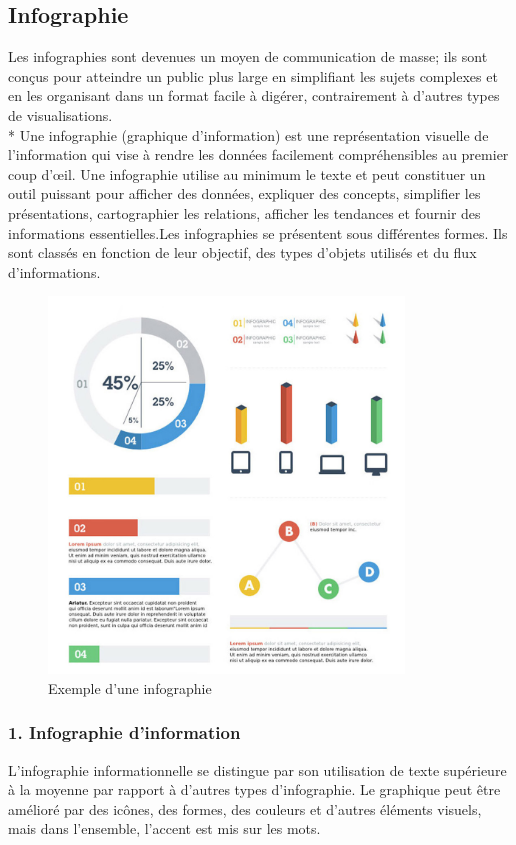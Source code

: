 \documentclass[french, a4paper, 12pt]{report}
\begin{document}
\subsection{Infographie}
Les infographies sont devenues un moyen de communication de masse; ils sont conçus pour atteindre un public plus large en simplifiant les sujets complexes et en les organisant dans un format facile à digérer, contrairement à d'autres types de visualisations. \\*
Une infographie (graphique d'information) est une représentation visuelle de l'information qui vise à rendre les données facilement compréhensibles au premier coup d'œil. Une infographie utilise au minimum le texte et peut constituer un outil puissant pour afficher des données, expliquer des concepts, simplifier les présentations, cartographier les relations, afficher les tendances et fournir des informations essentielles.Les infographies se présentent sous différentes formes. Ils sont classés en fonction de leur objectif, des types d’objets utilisés et du flux d’informations. 
\newpage
\begin{figure}[!ht]
    \centering
    \includegraphics[height=10cm]{images/infographic.jpg}
    \caption{Exemple d'une infographie \footnotemark}
    \label{fig:2.3}
\end{figure}
\subsubsection{1. Infographie d'information}
L'infographie informationnelle se distingue par son utilisation de texte supérieure à la moyenne par rapport à d'autres types d'infographie. Le graphique peut être amélioré par des icônes, des formes, des couleurs et d'autres éléments visuels, mais dans l'ensemble, l'accent est mis sur les mots.
\end{document}
